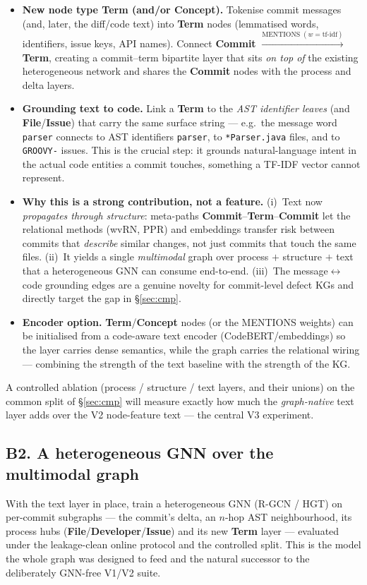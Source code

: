 \documentclass[11pt,a4paper]{article}
\newcommand{\node}[1]{\textcolor{kgblue}{\textbf{#1}}}
\newcommand{\edge}[1]{\textsc{#1}}
\begin{document}
	\begin{itemize}[nosep]
		\item \textbf{New node type \node{Term} (and/or \node{Concept}).} Tokenise commit
		messages (and, later, the diff/code text) into \node{Term} nodes (lemmatised
		words, identifiers, issue keys, API names). Connect
		\node{Commit} $\xrightarrow{\text{MENTIONS}\;(w=\text{tf-idf})}$ \node{Term},
		creating a commit--term bipartite layer that sits \emph{on top of} the existing
		heterogeneous network and shares the \node{Commit} nodes with the process and
		delta layers.
		\item \textbf{Grounding text to code.} Link a \node{Term} to the \emph{AST
		identifier leaves} (and \node{File}/\node{Issue}) that carry the same surface
		string --- e.g.\ the message word \texttt{parser} connects to AST identifiers
		\texttt{parser}, to \texttt{*Parser.java} files, and to \texttt{GROOVY-} issues.
		This is the crucial step: it grounds natural-language intent in the actual code
		entities a commit touches, something a TF-IDF vector cannot represent.
		\item \textbf{Why this is a strong contribution, not a feature.} (i)~Text now
		\emph{propagates through structure}: meta-paths
		\node{Commit}--\node{Term}--\node{Commit} let the relational methods (wvRN, PPR)
		and embeddings transfer risk between commits that \emph{describe} similar changes,
		not just commits that touch the same files. (ii)~It yields a single
		\emph{multimodal} graph over process $+$ structure $+$ text that a heterogeneous
		GNN can consume end-to-end. (iii)~The message$\leftrightarrow$code grounding edges
		are a genuine novelty for commit-level defect KGs and directly target the gap in
		\S\ref{sec:cmp}.
		\item \textbf{Encoder option.} \node{Term}/\node{Concept} nodes (or the
		\edge{MENTIONS} weights) can be initialised from a code-aware text encoder
		(CodeBERT/embeddings) so the layer carries dense semantics, while the graph
		carries the relational wiring --- combining the strength of the text baseline with
		the strength of the KG.
	\end{itemize}
	A controlled ablation (process / structure / text layers, and their unions) on the
	common split of \S\ref{sec:cmp} will measure exactly how much the \emph{graph-native}
	text layer adds over the V2 node-feature text --- the central V3 experiment.

	\subsection{B2. A heterogeneous GNN over the multimodal graph}
	With the text layer in place, train a heterogeneous GNN (R-GCN / HGT) on per-commit
	subgraphs --- the commit's delta, an $n$-hop AST neighbourhood, its process hubs
	(\node{File}/\node{Developer}/\node{Issue}) and its new \node{Term} layer ---
	evaluated under the leakage-clean online protocol and the controlled split. This is
	the model the whole graph was designed to feed and the natural successor to the
	deliberately GNN-free V1/V2 suite.
\end{document}
